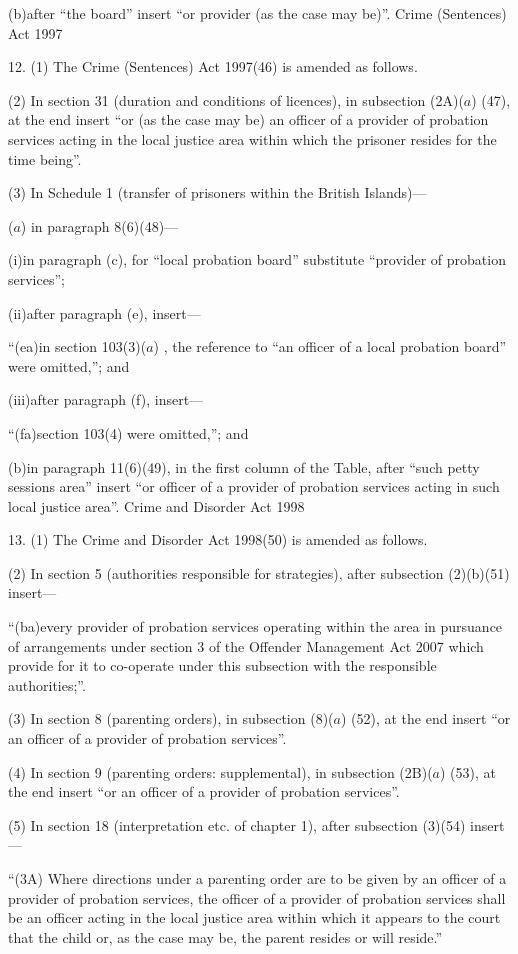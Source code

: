 \documentclass[12pt,a4paper]{article}
\begin{document}
(b)after “the board” insert “or provider (as the case may be)”.
Crime (Sentences) Act 1997

12.  (1)  The Crime (Sentences) Act 1997(46) is amended as follows.

(2) In section 31 (duration and conditions of licences), in subsection (2A)($a$) (47), at the end insert “or (as the case may be) an officer of a provider of probation services acting in the local justice area within which the prisoner resides for the time being”.

(3) In Schedule 1 (transfer of prisoners within the British Islands)—

($a$) in paragraph 8(6)(48)—

(i)in paragraph (c), for “local probation board” substitute “provider of probation services”;

(ii)after paragraph (e), insert—

“(ea)in section 103(3)($a$) , the reference to “an officer of a local probation board” were omitted,”; and

(iii)after paragraph (f), insert—

“(fa)section 103(4) were omitted,”; and

(b)in paragraph 11(6)(49), in the first column of the Table, after “such petty sessions area” insert “or officer of a provider of probation services acting in such local justice area”.
Crime and Disorder Act 1998

13.  (1)  The Crime and Disorder Act 1998(50) is amended as follows.

(2) In section 5 (authorities responsible for strategies), after subsection (2)(b)(51) insert—

“(ba)every provider of probation services operating within the area in pursuance of arrangements under section 3 of the Offender Management Act 2007 which provide for it to co-operate under this subsection with the responsible authorities;”.

(3) In section 8 (parenting orders), in subsection (8)($a$) (52), at the end insert “or an officer of a provider of probation services”.

(4) In section 9 (parenting orders: supplemental), in subsection (2B)($a$) (53), at the end insert “or an officer of a provider of probation services”.

(5) In section 18 (interpretation etc. of chapter 1), after subsection (3)(54) insert—

“(3A) Where directions under a parenting order are to be given by an officer of a provider of probation services, the officer of a provider of probation services shall be an officer acting in the local justice area within which it appears to the court that the child or, as the case may be, the parent resides or will reside.”
\end{document}
